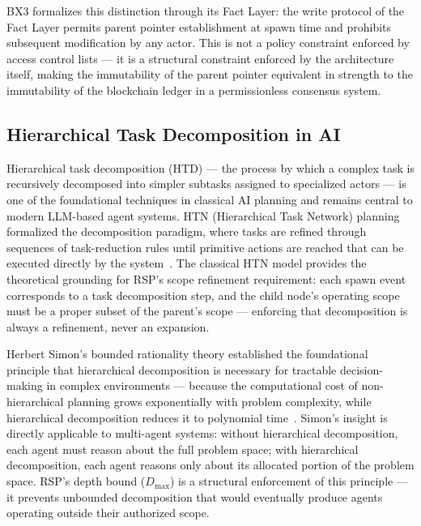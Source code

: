 BX3 formalizes this distinction through its Fact Layer: the write protocol of the Fact Layer permits parent pointer establishment at spawn time and prohibits subsequent modification by any actor. This is not a policy constraint enforced by access control lists — it is a structural constraint enforced by the architecture itself, making the immutability of the parent pointer equivalent in strength to the immutability of the blockchain ledger in a permissionless consensus system.

\subsection{Hierarchical Task Decomposition in AI}

Hierarchical task decomposition (HTD) — the process by which a complex task is recursively decomposed into simpler subtasks assigned to specialized actors — is one of the foundational techniques in classical AI planning and remains central to modern LLM-based agent systems. HTN (Hierarchical Task Network) planning formalized the decomposition paradigm, where tasks are refined through sequences of task-reduction rules until primitive actions are reached that can be executed directly by the system~\citep{ghallab2004htn,erpl}. The classical HTN model provides the theoretical grounding for RSP's scope refinement requirement: each spawn event corresponds to a task decomposition step, and the child node's operating scope must be a proper subset of the parent's scope — enforcing that decomposition is always a refinement, never an expansion.

Herbert Simon's bounded rationality theory established the foundational principle that hierarchical decomposition is necessary for tractable decision-making in complex environments — because the computational cost of non-hierarchical planning grows exponentially with problem complexity, while hierarchical decomposition reduces it to polynomial time~\citep{simon}. Simon's insight is directly applicable to multi-agent systems: without hierarchical decomposition, each agent must reason about the full problem space; with hierarchical decomposition, each agent reasons only about its allocated portion of the problem space. RSP's depth bound ($D_{\max}$) is a structural enforcement of this principle — it prevents unbounded decomposition that would eventually produce agents operating outside their authorized scope.

